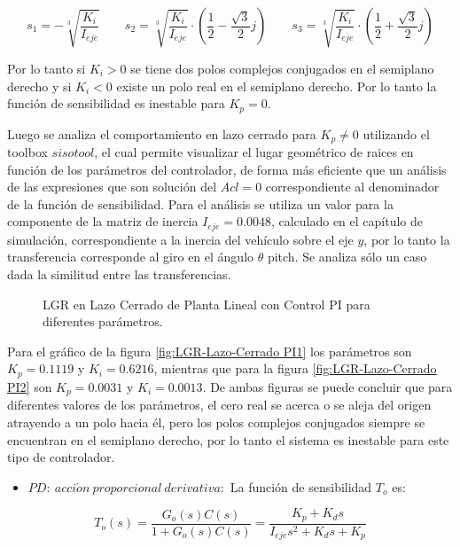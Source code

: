 \documentclass[../main.tex]{subfiles}
\begin{document}
\[
s_{1}=-\sqrt[3]{\frac{K_{i}}{I_{eje}}}\qquad s_{2}=\sqrt[3]{\frac{K_{i}}{I_{eje}}}\cdot(\frac{1}{2}-\frac{\sqrt{3}}{2}j)\qquad s_{3}=\sqrt[3]{\frac{K_{i}}{I_{eje}}}\cdot(\frac{1}{2}+\frac{\sqrt{3}}{2}j)
\]

Por lo tanto si $K_{i}>0$ se tiene dos polos complejos conjugados
en el semiplano derecho y si $K_{i}<0$ existe un polo real en el
semiplano derecho. Por lo tanto la función de sensibilidad es inestable
para $K_{p}=0$. 

Luego se analiza el comportamiento en lazo cerrado para $K_{p}\neq0$
utilizando el toolbox $sisotool$, el cual permite visualizar el lugar
geométrico de raices en función de los parámetros del controlador,
de forma más eficiente que un análisis de las expresiones que son
solución del $Acl=0$ correspondiente al denominador de la función
de sensibilidad. Para el análisis se utiliza un valor para la componente
de la matriz de inercia $I_{eje}=0.0048$, calculado en el capítulo
de simulación, correspondiente a la inercia del vehículo sobre el
eje $y$, por lo tanto la transferencia corresponde al giro en el
ángulo $\theta$ pitch. Se analiza sólo un caso dada la similitud
entre las transferencias.

\begin{figure}[H]
\noindent \begin{centering}
\par\end{centering}
\caption{LGR en Lazo Cerrado de Planta Lineal con Control PI para diferentes
parámetros.}
\end{figure}

Para el gráfico de la figura \ref{fig:LGR-Lazo-Cerrado PI1} los parámetros
son $K_{p}=0.1119$ y $K_{i}=0.6216$, mientras que para la figura
\ref{fig:LGR-Lazo-Cerrado PI2} son $K_{p}=0.0031$ y $K_{i}=0.0013$.
De ambas figuras se puede concluir que para diferentes valores de
los parámetros, el cero real se acerca o se aleja del origen atrayendo
a un polo hacia él, pero los polos complejos conjugados siempre se
encuentran en el semiplano derecho, por lo tanto el sistema es inestable
para este tipo de controlador.
\begin{itemize}
\item $PD:\ acci\acute{o}n\ proporcional\ derivativa:$ La función de sensibilidad
$T_{o}$ es:
\end{itemize}
\[
T_{o}(s)=\frac{G_{o}(s)C(s)}{1+G_{o}(s)C(s)}=\frac{K_{p}+K_{d}s}{I_{eje}s^{2}+K_{d}s+K_{p}}
\]
\end{document}
